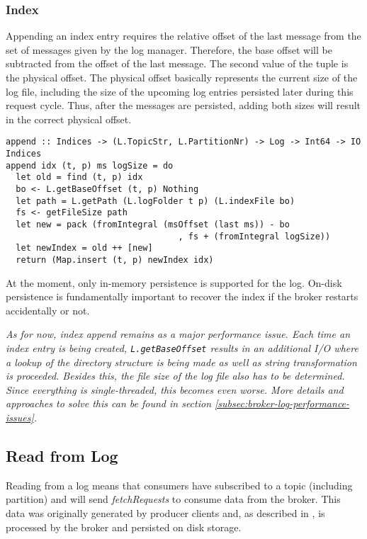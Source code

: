 \subsubsection{Index}

Appending an index entry requires the relative offset of the last message from
the set of messages given by the log manager. Therefore, the base offset will be
subtracted from the offset of the last message. The second value of the tuple is
the physical offset. The physical offset basically represents the current size
of the log file, including the size of the upcoming log entries persisted later
during this request cycle. Thus, after the messages are persisted, adding both
sizes will result in the correct physical offset.

\begin{lstlisting}[caption={Appending entry to index}]
append :: Indices -> (L.TopicStr, L.PartitionNr) -> Log -> Int64 -> IO Indices
append idx (t, p) ms logSize = do
  let old = find (t, p) idx
  bo <- L.getBaseOffset (t, p) Nothing 
  let path = L.getPath (L.logFolder t p) (L.indexFile bo)
  fs <- getFileSize path
  let new = pack (fromIntegral (msOffset (last ms)) - bo
                                  , fs + (fromIntegral logSize)) 
  let newIndex = old ++ [new]
  return (Map.insert (t, p) newIndex idx)
\end{lstlisting}

At the moment, only in-memory persistence is supported for the log. On-disk
persistence is fundamentally important to recover the index if the broker
restarts accidentally or not.

\textit{As for now, index append remains as a major performance issue. Each time
  an index entry is being created, \lstinline{L.getBaseOffset} results in an
  additional I/O where a lookup of the directory structure is being made as well
  as string transformation is proceeded. Besides this, the file size of the log
file also has to be determined. Since everything is single-threaded, this
becomes even worse. More details and approaches to solve this can be found in
section \ref{subsec:broker-log-performance-issues}.}


\subsection{Read from Log}
\label{subsec:broker-log-read}

Reading from a log means that consumers have subscribed to a topic (including
partition) and will send \textit{fetchRequests} to consume data from the broker.
This data was originally generated by producer clients and, as described in
\label{subsec:broker-log-append}, is processed by the broker and persisted on
disk storage.

